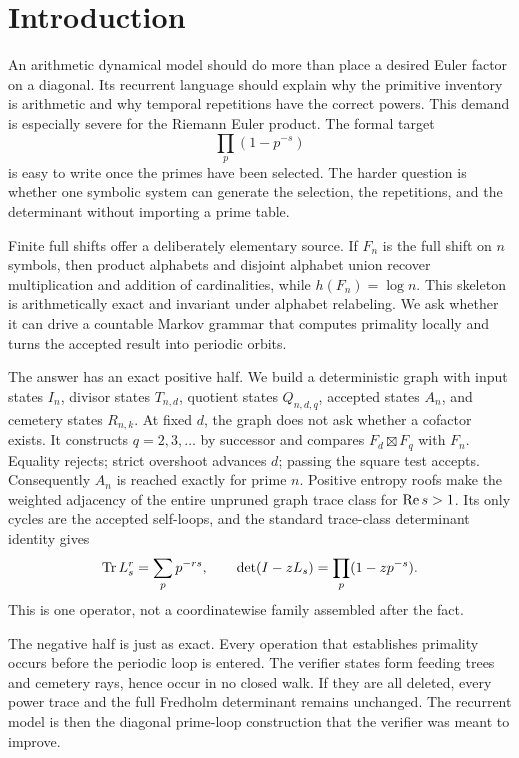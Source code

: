 \section{Introduction}
\label{sec:introduction}

An arithmetic dynamical model should do more than place a desired Euler
factor on a diagonal.  Its recurrent language should explain why the
primitive inventory is arithmetic and why temporal repetitions have the
correct powers.  This demand is especially severe for the Riemann Euler
product.  The formal target
\[
\prod_p(1-p^{-s})
\]
is easy to write once the primes have been selected.  The harder question is
whether one symbolic system can generate the selection, the repetitions, and
the determinant without importing a prime table.

Finite full shifts offer a deliberately elementary source.  If $F_n$ is the
full shift on $n$ symbols, then product alphabets and disjoint alphabet union
recover multiplication and addition of cardinalities, while
$h(F_n)=\log n$.  This skeleton is arithmetically exact and invariant under
alphabet relabeling.  We ask whether it can drive a countable Markov grammar
that computes primality locally and turns the accepted result into periodic
orbits.

The answer has an exact positive half.  We build a deterministic graph with
input states $I_n$, divisor states $T_{n,d}$, quotient states $Q_{n,d,q}$,
accepted states $A_n$, and cemetery states $R_{n,k}$.  At fixed $d$, the graph
does not ask whether a cofactor exists.  It constructs $q=2,3,\ldots$ by
successor and compares $F_d\boxtimes F_q$ with $F_n$.  Equality rejects;
strict overshoot advances $d$; passing the square test accepts.  Consequently
$A_n$ is reached exactly for prime $n$.  Positive entropy roofs make the
weighted adjacency of the entire unpruned graph trace class for
$\operatorname{Re} s>1$.  Its only cycles are the accepted self-loops, and the standard
trace-class determinant identity \citep{Simon1977} gives
\[
\operatorname{Tr} L_s^r=\sum_p p^{-rs},\qquad
\det(I-zL_s)=\prod_p(1-zp^{-s}).
\]
This is one operator, not a coordinatewise family assembled after the fact.

The negative half is just as exact.  Every operation that establishes
primality occurs before the periodic loop is entered.  The verifier states
form feeding trees and cemetery rays, hence occur in no closed walk.  If they
are all deleted, every power trace and the full Fredholm determinant remains
unchanged.  The recurrent model is then the diagonal prime-loop construction
that the verifier was meant to improve.

